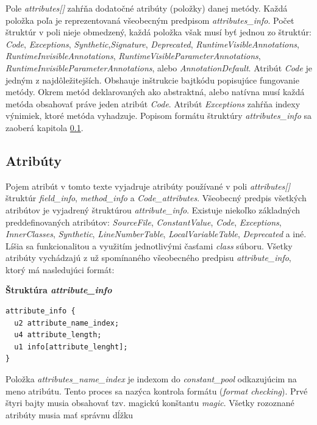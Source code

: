 \documentclass[11pt,final,oneside]{fithesis}
\newenvironment{example}[1]
{
\vspace{5mm}
\noindent\textbf{#1}
\vspace{1mm}
}
{
\vspace{5mm}
}
\begin{document}
Pole \textit{attributes[]} zahŕňa dodatočné atribúty (položky) danej metódy.
Každá položka poľa je reprezentovaná všeobecným predpisom
\textit{attributes\_info}. Počet štruktúr v poli nieje obmedzený, každá
položka však musí byť jednou zo štruktúr: \textit{Code}, \textit{Exceptions},
\textit{Synthetic},\textit{Signature}, \textit{Deprecated},
\textit{RuntimeVisibleAnnotations}, \textit{RuntimeInvisibleAnnotations},
\textit{RuntimeVisibleParameterAnnotations},
\textit{RuntimeInvisibleParameterAnnotations},
alebo \textit{AnnotationDefault}.
Atribút \textit{Code} je jedným z najdôležitejších. Obshauje inštrukcie
bajtkódu popisujúce fungovanie metódy. Okrem metód deklarovaných ako
abstraktná, alebo natívna musí každá metóda obsahovať práve jeden atribút
\textit{Code}. Atribút \textit{Exceptions} zahŕňa indexy výnimiek, ktoré
metóda vyhadzuje. Popisom formátu štruktúry \textit{attributes\_info} sa
zaoberá kapitola \ref{sec:attributes}.

\subsection{Atribúty}
\label{sec:attributes}
Pojem atribút v tomto texte vyjadruje atribúty používané v poli
\textit{attributes[]} štruktúr \textit{field\_info}, \textit{method\_info} a
\textit{Code\_attributes}. Všeobecný predpis všetkých atribútov je vyjadrený
štruktúrou \textit{attribute\_info}. Existuje niekoľko základných
preddefinovaných atribútov: \textit{SourceFile}, \textit{ConstantValue},
\textit{Code}, \textit{Exceptions}, \textit{InnerClasses}, \textit{Synthetic},
\textit{LineNumberTable}, \textit{LocalVariableTable}, \textit{Deprecated} a
iné. Líšia sa funkcionalitou a využitím jednotlivými časťami \textit{class}
súboru. Všetky atribúty vychádzajú z už spomínaného všeobecného predpisu
\textit{attribute\_info}, ktorý má nasledujúci formát:

\begin{example}{Štruktúra \textit{attribute\_info}}
\begin{verbatim}
attribute_info {
  u2 attribute_name_index;
  u4 attribute_length;
  u1 info[attribute_lenght];
}
\end{verbatim}
\end{example}

Položka \textit{attributes\_name\_index} je indexom do \textit{constant\_pool}
odkazujúcim na meno atribútu. Tento proces sa nazýca kontrola formátu
(\textit{format checking}). Prvé štyri bajty musia obsahovať tzv. magickú
konštantu \textit{magic}. Všetky rozoznané atribúty musia mať správnu dĺžku 
\end{document}
